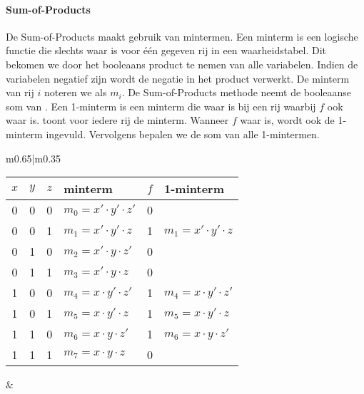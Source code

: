 \paragraph{Sum-of-Products} De Sum-of-Products maakt gebruik van mintermen. Een minterm is een logische functie die slechts waar is voor \'e\'en gegeven rij in een waarheidstabel. Dit bekomen we door het booleaans product te nemen van alle variabelen. Indien de variabelen negatief zijn wordt de negatie in het product verwerkt. De minterm van rij $i$ noteren we als $m_i$. De Sum-of-Products methode neemt de booleaanse som van . Een 1-minterm is een minterm die waar is bij een rij waarbij $f$ ook waar is.  toont voor iedere rij de minterm. Wanneer $f$ waar is, wordt ook de 1-minterm ingevuld. Vervolgens bepalen we de som van alle 1-mintermen.
\begin{table}[htb]
\begin{center}
\begin{tabular}{m{}|m{}}
\begin{center}
\begin{tabular}{ccc|l|c|l}
$x$&$y$&$z$&minterm&$f$&1-minterm\\\hline
0&0&0&$m_0=x'\cdot y'\cdot z'$&0&\\
0&0&1&$m_1=x'\cdot y'\cdot z$&1&$m_1=x'\cdot y'\cdot z$\\
0&1&0&$m_2=x'\cdot y\cdot z'$&0&\\
0&1&1&$m_3=x'\cdot y\cdot z$&0&\\
1&0&0&$m_4=x\cdot y'\cdot z'$&1&$m_4=x\cdot y'\cdot z'$\\
1&0&1&$m_5=x\cdot y'\cdot z$&1&$m_5=x\cdot y'\cdot z$\\
1&1&0&$m_6=x\cdot y\cdot z'$&1&$m_6=x\cdot y\cdot z'$\\
1&1&1&$m_7=x\cdot y\cdot z$&0&\\
\end{tabular}
\end{center}
&
\begin{center}
\end{center}
\end{tabular}
\end{center}
\end{table}
